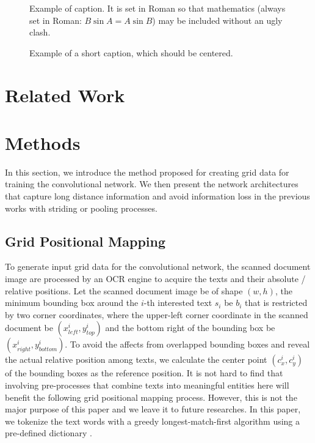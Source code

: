 \documentclass[10pt,twocolumn,letterpaper]{article}
\begin{document}
\begin{figure}[t]
\begin{center}
\fbox{\rule{0pt}{2in} \rule{0.9\linewidth}{0pt}}
\end{center}
   \caption{Example of caption.  It is set in Roman so that mathematics
   (always set in Roman: $B \sin A = A \sin B$) may be included without an
   ugly clash.}
\label{fig:long}
\label{fig:onecol}
\end{figure}

\begin{figure*}
\begin{center}
\fbox{\rule{0pt}{2in} \rule{.9\linewidth}{0pt}}
\end{center}
   \caption{Example of a short caption, which should be centered.}
\label{fig:short}
\end{figure*}

\section{Related Work}


\section{Methods}
In this section, we introduce the method proposed for creating grid data for training the convolutional network. We then present the network architectures that capture long distance information and avoid information loss in the previous works with striding or pooling processes.

\subsection{Grid Positional Mapping}
To generate input grid data for the convolutional network, the scanned document image are processed by an OCR engine to acquire the texts and their absolute / relative positions. Let the scanned document image be of shape $(w, h)$, the minimum bounding box around the $i$-th interested text $s_i$ be $b_i$ that is restricted by two corner coordinates, where the upper-left corner coordinate in the scanned document be $(x^i_{left}, y^i_{top})$ and the bottom right of the bounding box be $(x^i_{right}, y^i_{bottom})$. To avoid the affects from overlapped bounding boxes and reveal the actual relative position among texts, we calculate the center point $(c^i_x, c^i_y)$ of the bounding boxes as the reference position. It is not hard to find that involving pre-processes that combine texts into meaningful entities here will benefit the following grid positional mapping process. However, this is not the major purpose of this paper and we leave it to future researches. In this paper, we tokenize the text words with a greedy longest-match-first algorithm using a pre-defined dictionary \cite{bertgit}. 
\end{document}
